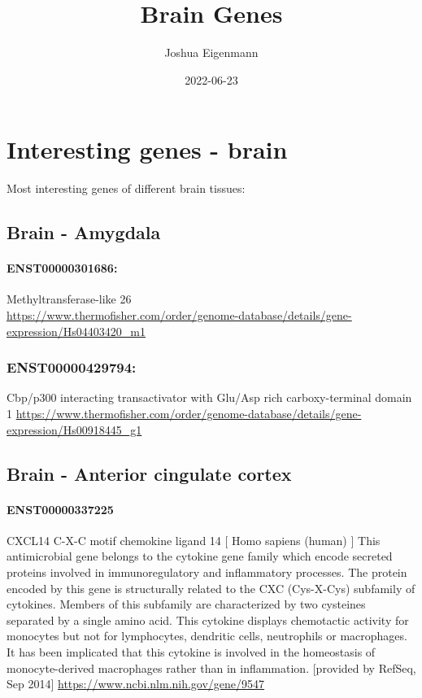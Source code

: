 \documentclass[
]{article}
\title{Brain Genes}
\author{Joshua Eigenmann}
\date{2022-06-23}
\begin{document}
\maketitle

\hypertarget{interesting-genes---brain}{%
\section{Interesting genes - brain}\label{interesting-genes---brain}}

Most interesting genes of different brain tissues:

\hypertarget{brain---amygdala}{%
\subsection{Brain - Amygdala}\label{brain---amygdala}}

\hypertarget{enst00000301686}{%
\paragraph{ENST00000301686:}\label{enst00000301686}}

Methyltransferase-like 26\\
\url{https://www.thermofisher.com/order/genome-database/details/gene-expression/Hs04403420_m1}

\hypertarget{enst00000429794}{%
\subsubsection{ENST00000429794:}\label{enst00000429794}}

Cbp/p300 interacting transactivator with Glu/Asp rich carboxy-terminal
domain 1
\url{https://www.thermofisher.com/order/genome-database/details/gene-expression/Hs00918445_g1}

\hypertarget{brain---anterior-cingulate-cortex}{%
\subsection{Brain - Anterior cingulate
cortex}\label{brain---anterior-cingulate-cortex}}

\hypertarget{enst00000337225}{%
\paragraph{ENST00000337225}\label{enst00000337225}}

CXCL14 C-X-C motif chemokine ligand 14 {[} Homo sapiens (human) {]} This
antimicrobial gene belongs to the cytokine gene family which encode
secreted proteins involved in immunoregulatory and inflammatory
processes. The protein encoded by this gene is structurally related to
the CXC (Cys-X-Cys) subfamily of cytokines. Members of this subfamily
are characterized by two cysteines separated by a single amino acid.
This cytokine displays chemotactic activity for monocytes but not for
lymphocytes, dendritic cells, neutrophils or macrophages. It has been
implicated that this cytokine is involved in the homeostasis of
monocyte-derived macrophages rather than in inflammation. {[}provided by
RefSeq, Sep 2014{]} \url{https://www.ncbi.nlm.nih.gov/gene/9547}
\end{document}
